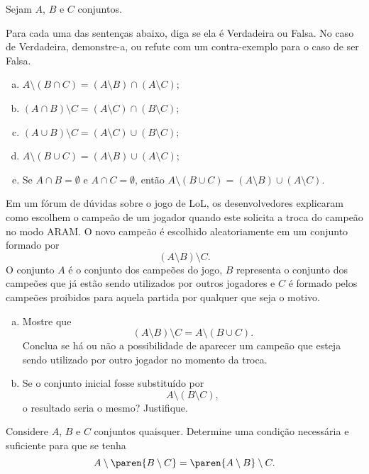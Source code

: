 \begin{exercise}
  Sejam $A$, $B$ e $C$ conjuntos.
        
       Para cada uma das sentenças abaixo, diga se ela é Verdadeira ou Falsa. No caso de Verdadeira, demonstre-a, ou refute com um contra-exemplo para o caso de ser Falsa.
       \begin{enumerate}[a)]
            \item $A \setminus ( B \cap C) = (A \setminus B) \cap (A \setminus C)$;
            \item $(A \cap B) \setminus C = (A \setminus C) \cap (B \setminus C)$;
            \item $(A \cup B) \setminus C = (A \setminus C) \cup (B \setminus C)$;
            \item $A \setminus ( B \cup C) = (A \setminus B) \cup (A \setminus C)$;
            \item Se $A \cap B = \emptyset$ e $A \cap C = \emptyset$, então $A \setminus ( B \cup C) = (A \setminus B) \cup (A \setminus C)$.
       \end{enumerate}
\end{exercise}

\begin{exercise}
  Em um fórum de dúvidas sobre o jogo de LoL, os desenvolvedores explicaram como escolhem o campeão de um jogador quando este solicita a troca do campeão no modo ARAM. O novo campeão é escolhido aleatoriamente em um conjunto formado por $$\left(A \setminus B \right) \setminus C.$$
  O conjunto $A$ é o conjunto dos campeões do jogo, $B$ representa o conjunto dos campeões que já estão sendo utilizados por outros jogadores e $C$ é formado pelos campeões proibidos para aquela partida por qualquer que seja o motivo.  \begin{enumerate}[a)]
    \item Mostre que $$\left(A \setminus B \right) \setminus C = A \setminus \left( B \cup C \right).$$ Conclua se há ou não a possibilidade de aparecer um campeão que esteja sendo utilizado por outro jogador no momento da troca. 
    \item Se o conjunto inicial fosse substituído por $$ A \setminus \left( B \setminus C \right),$$ o resultado seria o mesmo? Justifique.
  \end{enumerate}
\end{exercise}

\begin{exercise}
  Considere $A$, $B$ e $C$ conjuntos quaisquer. Determine uma condição necessária e suficiente para que se tenha
  $$A \setminus \paren{B \setminus C} = \paren{A \setminus B} \setminus C.$$
\end{exercise}

